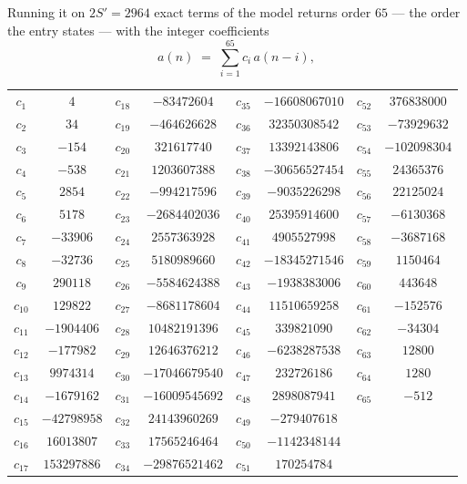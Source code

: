 \documentclass[11pt,a4paper]{article}
\theoremstyle{plain}
\theoremstyle{definition}
\begin{document}
Running it on $2S'=2964$ exact terms of the model returns order $65$ --- the order the
entry states --- with the integer coefficients
\[
a(n)\;=\;\sum_{i=1}^{65}c_i\,a(n-i),
\]
\begin{center}\small
\begin{tabular}{cccccccc}
$c_{1}$ & $4$ & $c_{18}$ & $-83472604$ & $c_{35}$ & $-16608067010$ & $c_{52}$ & $376838000$ \\
$c_{2}$ & $34$ & $c_{19}$ & $-464626628$ & $c_{36}$ & $32350308542$ & $c_{53}$ & $-73929632$ \\
$c_{3}$ & $-154$ & $c_{20}$ & $321617740$ & $c_{37}$ & $13392143806$ & $c_{54}$ & $-102098304$ \\
$c_{4}$ & $-538$ & $c_{21}$ & $1203607388$ & $c_{38}$ & $-30656527454$ & $c_{55}$ & $24365376$ \\
$c_{5}$ & $2854$ & $c_{22}$ & $-994217596$ & $c_{39}$ & $-9035226298$ & $c_{56}$ & $22125024$ \\
$c_{6}$ & $5178$ & $c_{23}$ & $-2684402036$ & $c_{40}$ & $25395914600$ & $c_{57}$ & $-6130368$ \\
$c_{7}$ & $-33906$ & $c_{24}$ & $2557363928$ & $c_{41}$ & $4905527998$ & $c_{58}$ & $-3687168$ \\
$c_{8}$ & $-32736$ & $c_{25}$ & $5180989660$ & $c_{42}$ & $-18345271546$ & $c_{59}$ & $1150464$ \\
$c_{9}$ & $290118$ & $c_{26}$ & $-5584624388$ & $c_{43}$ & $-1938383006$ & $c_{60}$ & $443648$ \\
$c_{10}$ & $129822$ & $c_{27}$ & $-8681178604$ & $c_{44}$ & $11510659258$ & $c_{61}$ & $-152576$ \\
$c_{11}$ & $-1904406$ & $c_{28}$ & $10482191396$ & $c_{45}$ & $339821090$ & $c_{62}$ & $-34304$ \\
$c_{12}$ & $-177982$ & $c_{29}$ & $12646376212$ & $c_{46}$ & $-6238287538$ & $c_{63}$ & $12800$ \\
$c_{13}$ & $9974314$ & $c_{30}$ & $-17046679540$ & $c_{47}$ & $232726186$ & $c_{64}$ & $1280$ \\
$c_{14}$ & $-1679162$ & $c_{31}$ & $-16009545692$ & $c_{48}$ & $2898087941$ & $c_{65}$ & $-512$ \\
$c_{15}$ & $-42798958$ & $c_{32}$ & $24143960269$ & $c_{49}$ & $-279407618$ &  &  \\
$c_{16}$ & $16013807$ & $c_{33}$ & $17565246464$ & $c_{50}$ & $-1142348144$ &  &  \\
$c_{17}$ & $153297886$ & $c_{34}$ & $-29876521462$ & $c_{51}$ & $170254784$ &  &  \\
\end{tabular}
\end{center}
\end{document}
